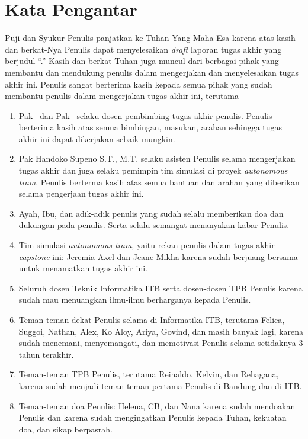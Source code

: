 \chapter*{Kata Pengantar}

Puji dan Syukur Penulis panjatkan ke Tuhan Yang Maha Esa karena atas kasih dan
berkat-Nya Penulis dapat menyelesaikan \textit{draft} laporan tugas akhir yang
berjudul ``\thetitle.'' Kasih dan berkat Tuhan juga muncul dari berbagai pihak
yang membantu dan mendukung penulis dalam mengerjakan dan menyelesaikan tugas
akhir ini. Penulis sangat berterima kasih kepada semua pihak yang sudah membantu
penulis dalam mengerjakan tugas akhir ini, terutama

\begin{enumerate}
	\item Pak \pembimbingSatu\ dan Pak \pembimbingDua\ selaku dosen pembimbing
	      tugas akhir penulis. Penulis berterima kasih atas semua bimbingan, masukan,
	      arahan sehingga tugas akhir ini dapat dikerjakan sebaik mungkin.
	\item Pak Handoko Supeno S.T., M.T. selaku asisten Penulis selama
	      mengerjakan tugas akhir dan juga selaku pemimpin tim simulasi di proyek
	      \textit{autonomous tram}. Penulis berterma kasih atas semua bantuan dan
	      arahan yang diberikan selama pengerjaan tugas akhir ini.
	\item Ayah, Ibu, dan adik-adik penulis yang sudah selalu memberikan doa dan
	      dukungan pada penulis. Serta selalu semangat menanyakan kabar Penulis.
	\item Tim simulasi \textit{autonomous tram}, yaitu rekan penulis dalam tugas
	      akhir \textit{capstone} ini: Jeremia Axel dan Jeane Mikha karena sudah
	      berjuang bersama untuk menamatkan tugas akhir ini.
	\item Seluruh dosen Teknik Informatika ITB serta dosen-dosen TPB Penulis
	      karena sudah mau menuangkan ilmu-ilmu berharganya kepada Penulis.
	\item Teman-teman dekat Penulis selama di Informatika ITB, terutama Felica,
	      Suggoi, Nathan, Alex, Ko Aloy, Ariya, Govind, dan masih banyak lagi, karena
	      sudah menemani, menyemangati, dan memotivasi Penulis selama setidaknya 3
	      tahun terakhir.
	\item Teman-teman TPB Penulis, terutama Reinaldo, Kelvin, dan Rehagana,
	      karena sudah menjadi teman-teman pertama Penulis di Bandung dan di ITB.
	\item Teman-teman doa Penulis: Helena, CB, dan Nana karena sudah mendoakan
	      Penulis dan karena sudah mengingatkan Penulis kepada Tuhan, kekuatan
	      doa, dan sikap berpasrah.
\end{enumerate}
